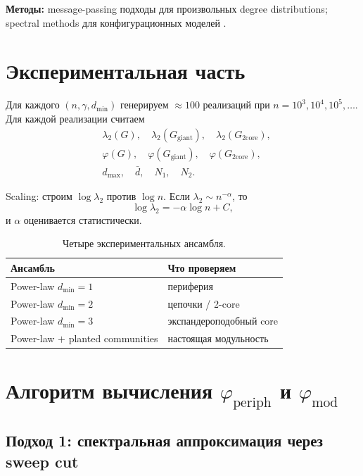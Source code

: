 \documentclass[11pt,a4paper]{article}
\theoremstyle{plain}
\theoremstyle{definition}
\theoremstyle{remark}
\newcommand{\core}{\mathrm{core}}
\newcommand{\giant}{\mathrm{giant}}
\newcommand{\periph}{\mathrm{periph}}
\newcommand{\modu}{\mathrm{mod}}
\newcommand{\Ph}{\varphi}
\newcommand{\dmin}{d_{\min}}
\newcommand{\dmax}{d_{\max}}
\newcommand{\dbar}{\bar d}
\newcommand{\lamtwo}{\lambda_2}
\newcommand{\Ggiant}{G_{\giant}}
\newcommand{\Gtwo}{G_{2\core}}
\begin{document}
\textbf{Методы:} message-passing подходы для произвольных degree distributions;
spectral methods для конфигурационных моделей
\cite{DorogovtsevGoltsevMendesSamukhin2003,Soderberg2002,BordenaveLelargeMassoulie2018}.

\section{Экспериментальная часть}
\label{sec:experiments}

Для каждого $(n,\gamma,\dmin)$ генерируем $\approx 100$ реализаций при
$n=10^3,10^4,10^5,\dots$. Для каждой реализации считаем
\begin{align}
&\lamtwo(G),\quad \lamtwo(\Ggiant),\quad \lamtwo(\Gtwo),\\
&\Ph(G),\quad \Ph(\Ggiant),\quad \Ph(\Gtwo),\\
&\dmax,\quad \dbar,\quad N_1,\quad N_2 .
\end{align}

Scaling: строим $\log\lamtwo$ против $\log n$. Если $\lamtwo\sim n^{-\alpha}$,
то
\begin{equation}
\log\lamtwo=-\alpha\log n+C,
\end{equation}
и $\alpha$ оценивается статистически.

\begin{table}[h]
\centering
\begin{tabular}{lp{8.5cm}}
\toprule
Ансамбль & Что проверяем \\
\midrule
Power-law $\dmin=1$ & периферия \\
Power-law $\dmin=2$ & цепочки / 2-core \\
Power-law $\dmin=3$ & экспандероподобный core \\
Power-law $+$ planted communities & настоящая модульность \\
\bottomrule
\end{tabular}
\caption{Четыре экспериментальных ансамбля.}
\end{table}

\section{Алгоритм вычисления $\Ph_{\periph}$ и $\Ph_{\modu}$}
\label{sec:algorithm}

\subsection*{Подход 1: спектральная аппроксимация через sweep cut}
\end{document}
